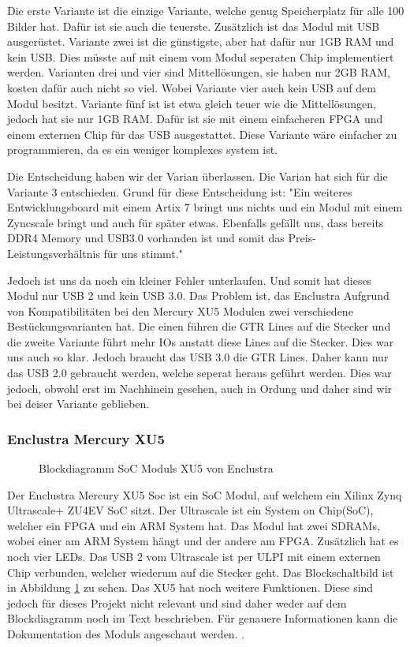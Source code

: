 \documentclass{article}
\begin{document}
    Die erste Variante ist die einzige Variante, welche genug Speicherplatz für alle 100 Bilder hat. Dafür ist sie auch die teuerste. Zusätzlich ist das Modul mit USB ausgerüstet. Variante zwei ist die günstigste, aber hat dafür nur 1GB RAM und kein USB. Dies müsste auf mit einem vom Modul seperaten Chip implementiert werden. Varianten drei und vier sind Mittellösungen, sie haben nur 2GB RAM, kosten dafür auch nicht so viel. Wobei Variante vier auch kein USB auf dem Modul besitzt. Variante fünf ist ist etwa gleich teuer wie die Mittellösungen, jedoch hat sie nur 1GB RAM. Dafür ist sie mit einem einfacheren FPGA und einem externen Chip für das USB ausgestattet. Diese Variante wäre einfacher zu programmieren, da es ein weniger komplexes system ist.

    Die Entscheidung haben wir der Varian überlassen. Die Varian hat sich für die Variante 3 entschieden. Grund für diese Entscheidung ist: "Ein weiteres Entwicklungsboard mit einem Artix 7 bringt uns nichts und ein Modul mit einem Zyncscale bringt und auch für später etwas. Ebenfalls gefällt uns, dass bereits DDR4 Memory und USB3.0 vorhanden ist und somit das Preis-Leistungsverhältnis für uns stimmt."

    Jedoch ist uns da noch ein kleiner Fehler unterlaufen. Und somit hat dieses Modul nur USB 2 und kein USB 3.0. Das Problem ist, das Enclustra Aufgrund von Kompatibilitäten bei den Mercury XU5 Modulen zwei verschiedene Bestückungsvarianten hat. Die einen führen die GTR Lines auf die Stecker und die zweite Variante führt mehr IOs anstatt diese Lines auf die Stecker. Dies war uns auch so klar. Jedoch braucht das USB 3.0 die GTR Lines. Daher kann nur das USB 2.0 gebraucht werden, welche seperat heraus geführt werden. Dies war jedoch, obwohl erst im Nachhinein gesehen, auch in Ordung und daher sind wir bei deiser Variante geblieben.
    
\subsubsection*{Enclustra Mercury XU5}
\begin{figure}[tb]
    \caption{Blockdiagramm SoC Moduls XU5 von Enclustra}
    \label{fig:bd_xu5}
\end{figure}
Der Enclustra Mercury XU5 Soc ist ein SoC Modul, auf welchem ein Xilinx Zynq Ultrascale+ ZU4EV SoC sitzt. Der Ultrascale ist ein System on Chip(SoC), welcher ein FPGA und ein ARM System hat. Das Modul hat zwei SDRAMs, wobei einer am ARM System hängt und der andere am FPGA. Zusätzlich hat es noch vier LEDs. Das USB 2 vom Ultrascale ist per ULPI mit einem externen Chip verbunden, welcher wiederum auf die Stecker geht. Das Blockschaltbild ist in Abbildung \ref{fig:bd_xu5} zu sehen. Das XU5 hat noch weitere Funktionen. Diese sind jedoch für dieses Projekt nicht relevant und sind daher weder auf dem Blockdiagramm noch im Text beschrieben. Für genauere Informationen kann die Dokumentation des Moduls angeschaut werden. .
\end{document}
